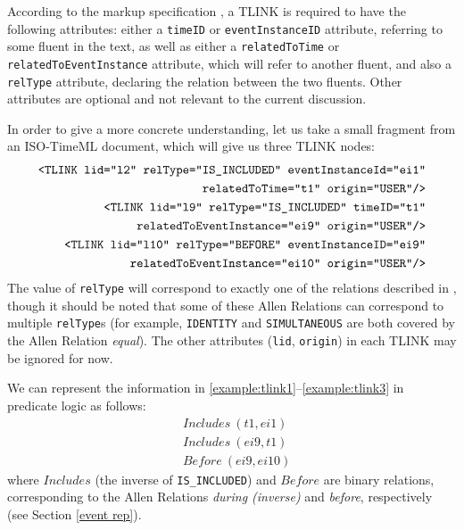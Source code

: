 \documentclass[a4paper,11pt,leqno]{article}
\begin{document}
According to the markup specification \citep{timeml2005timeml}, a TLINK is 
required to have the following attributes: either a \texttt{timeID} or 
\texttt{eventInstanceID} attribute, referring to some fluent in the text, as 
well as either a \texttt{relatedToTime} or \texttt{relatedToEventInstance} 
attribute, which will refer to another fluent, and also a \texttt{relType} 
attribute, declaring the relation between the two fluents. Other attributes are 
optional and not relevant to the current discussion.

In order to give a more concrete understanding, let us take a small fragment 
from an ISO-TimeML document, which will give us three TLINK nodes:
\begin{subequations}
\begin{align}
\label{example:tlink1}\mbox{\texttt{<TLINK lid="l2" relType="IS\_INCLUDED" 
		eventInstanceId="ei1"}}\\ 
\mbox{\texttt{relatedToTime="t1" origin="USER"/>}} \notag\\
\label{example:tlink2}\mbox{\texttt{<TLINK lid="l9" relType="IS\_INCLUDED" 
		timeID="t1"}}\\ 
\mbox{\texttt{relatedToEventInstance="ei9" origin="USER"/>}} \notag\\
\label{example:tlink3}\mbox{\texttt{<TLINK lid="l10" relType="BEFORE" 
		eventInstanceID="ei9"}}\\
\mbox{\texttt{relatedToEventInstance="ei10" origin="USER"/>}} \notag
\end{align}
\end{subequations}
The value of \texttt{relType} will correspond to exactly one of the relations 
described in \cite{allen1983maintaining}, though it should be noted that some 
of these Allen Relations can correspond to multiple \texttt{relType}s (for 
example, \texttt{IDENTITY} and \texttt{SIMULTANEOUS} are both covered by the 
Allen Relation \textit{equal}). The other attributes (\texttt{lid}, 
\texttt{origin}) in each TLINK may be ignored for now.

We can represent the information in 
\ref{example:tlink1}--\ref{example:tlink3} in predicate logic as 
follows:
\begin{subequations}
	\begin{align}
	&Includes~(t1,ei1)\\
	&Includes~(ei9,t1)\\
	&Before~(ei9,ei10)
	\end{align}
\end{subequations}
where $Includes$ (the inverse of \texttt{IS\_INCLUDED}) and $Before$ are binary 
relations, corresponding to the Allen Relations \textit{during (inverse)} and 
\textit{before}, respectively (see Section \ref{event rep}).
\end{document}
